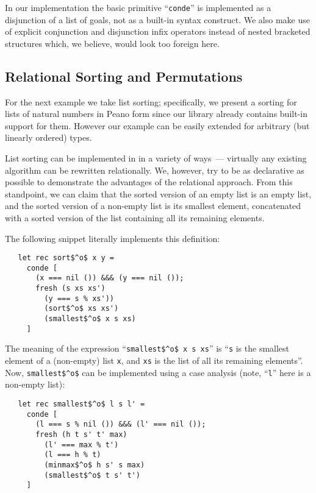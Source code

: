 In our implementation the basic \miniKanren primitive ``\lstinline{conde}'' is implemented as a
disjunction of a list of goals, not as a built-in syntax construct. We also make use of explicit
conjunction and disjunction infix operators instead of nested bracketed structures which, we
believe, would look too foreign here.

\subsection{Relational Sorting and Permutations}

For the next example we take list sorting; specifically, we present a sorting for lists of natural numbers
in Peano form since our library already contains built-in support for them. However our example can be
easily extended for arbitrary (but linearly ordered) types.

List sorting can be implemented in \miniKanren in a variety of ways~--- virtually any existing algorithm can
be rewritten relationally. We, however, try to be as declarative as possible to demonstrate the
advantages of the relational approach. From this standpoint, we can claim that the sorted version of an empty list is an
empty list, and the sorted version of a non-empty list is its smallest element, concatenated with a sorted
version of the list containing all its remaining elements.

The following snippet literally implements this definition:

\begin{lstlisting}
   let rec sort$^o$ x y =
     conde [
       (x === nil ()) &&& (y === nil ());
       fresh (s xs xs')
         (y === s % xs'))
         (sort$^o$ xs xs')
         (smallest$^o$ x s xs)
     ]
\end{lstlisting}

The meaning of the expression ``\lstinline{smallest$^o$ x s xs}'' is ``\lstinline{s} is the smallest element of a (non-empty) list \lstinline{x}, and \lstinline{xs} is the
list of all its remaining elements''. Now, \lstinline{smallest$^o$} can be implemented using a case analysis (note, ``\lstinline{l}'' here is a non-empty list):

\begin{lstlisting}
   let rec smallest$^o$ l s l' =
     conde [
       (l === s % nil ()) &&& (l' === nil ());
       fresh (h t s' t' max)
         (l' === max % t')
         (l === h % t)
         (minmax$^o$ h s' s max)
         (smallest$^o$ t s' t')
     ]
\end{lstlisting}

